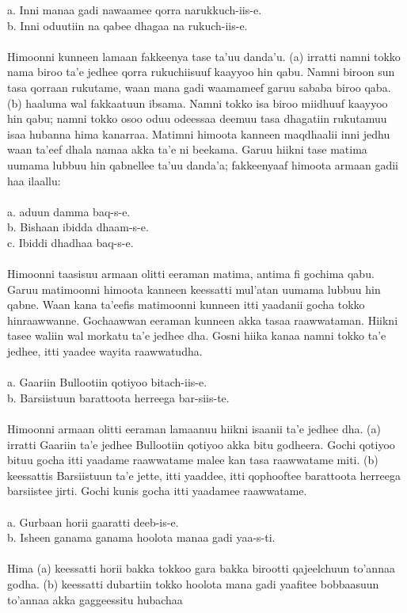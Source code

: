 \documentclass[11pt,b5paper]{book}
\begin{document}
a. Inni manaa gadi nawaamee qorra narukkuch-iis-e.\\
b. Inni oduutiin na qabee dhagaa na rukuch-iis-e.\\
\\

Himoonni kunneen lamaan fakkeenya tase ta’uu danda’u. (a) irratti namni tokko nama biroo ta’e jedhee qorra rukuchiisuuf kaayyoo hin qabu. Namni biroon sun tasa qorraan rukutame, waan mana gadi waamameef garuu sababa biroo qaba. (b) haaluma wal fakkaatuun ibsama. Namni tokko isa biroo miidhuuf kaayyoo hin qabu; namni tokko osoo oduu odeessaa deemuu tasa dhagatiin rukutamuu isaa hubanna hima kanarraa. Matimni himoota kanneen maqdhaalii inni jedhu waan ta’eef dhala namaa akka ta’e ni beekama. Garuu hiikni tase matima uumama lubbuu hin qabnellee ta’uu danda’a; fakkeenyaaf himoota armaan gadii haa ilaallu: \\
\\
a. aduun damma baq-s-e.\\
b. Bishaan ibidda dhaam-s-e.\\
c. Ibiddi dhadhaa baq-s-e.\\
\\
Himoonni taasisuu armaan olitti
eeraman matima, antima fi gochima qabu. Garuu matimoonni himoota kanneen keessatti mul’atan uumama
lubbuu hin qabne. Waan kana ta’eefis matimoonni kunneen itti yaadanii gocha tokko hinraawwanne. Gochaawwan eeraman kunneen akka tasaa raawwataman. Hiikni tasee waliin wal morkatu ta’e jedhee dha. Gosni hiika kanaa namni tokko ta’e jedhee, itti yaadee wayita raawwatudha.\\
\\
a. Gaariin Bullootiin qotiyoo bitach-iis-e.\\
b. Barsiistuun barattoota herreega bar-siis-te.\\
\\
Himoonni armaan olitti eeraman lamaanuu hiikni isaanii ta’e jedhee dha. (a) irratti Gaariin ta’e jedhee Bullootiin qotiyoo akka bitu godheera. Gochi qotiyoo bituu gocha itti yaadame
raawwatame malee kan tasa raawwatame miti. (b) keessattis Barsiistuun ta’e jette, itti yaaddee, itti
qophooftee barattoota herreega barsiistee jirti. Gochi kunis gocha itti yaadamee raawwatame.\\
\\
a. Gurbaan horii gaaratti deeb-is-e.\\
b. Isheen ganama ganama hoolota manaa gadi yaa-s-ti.\\
\\
Hima (a) keessatti horii bakka tokkoo gara bakka birootti qajeelchuun to’annaa godha. (b) keessatti dubartiin tokko hoolota mana gadi yaafitee bobbaasuun to’annaa akka gaggeessitu hubachaa
\end{document}
